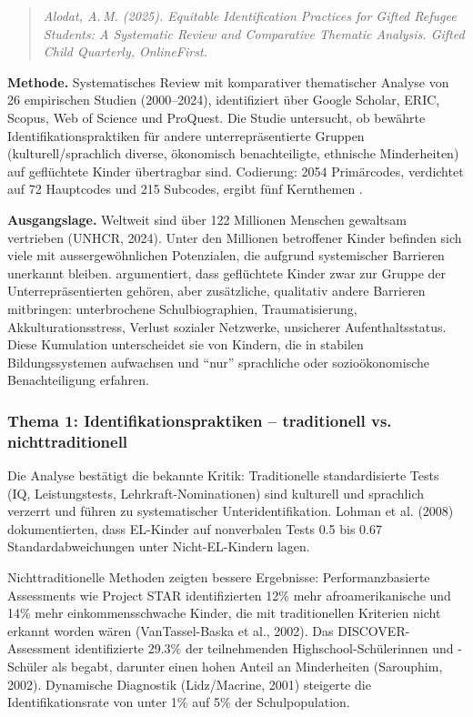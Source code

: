 \documentclass[ngerman, a4paper]{article}
\begin{document}
\begin{quote}\itshape
Alodat, A.\,M. (2025). Equitable Identification Practices for Gifted
Refugee Students: A Systematic Review and Comparative Thematic Analysis.
\upshape Gifted Child Quarterly, OnlineFirst.
\end{quote}

\textbf{Methode.} Systematisches Review mit komparativer thematischer
Analyse von 26 empirischen Studien (2000--2024), identifiziert über Google
Scholar, ERIC, Scopus, Web of Science und ProQuest. Die Studie untersucht,
ob bewährte Identifikationspraktiken für andere unterrepräsentierte Gruppen
(kulturell/sprachlich diverse, ökonomisch benachteiligte, ethnische
Minderheiten) auf geflüchtete Kinder übertragbar sind. Codierung: 2054
Primärcodes, verdichtet auf 72 Hauptcodes und 215 Subcodes, ergibt fünf
Kernthemen \parencite{alodat2025equitable}.

\textbf{Ausgangslage.} Weltweit sind über 122 Millionen Menschen
gewaltsam vertrieben (UNHCR, 2024). Unter den Millionen betroffener Kinder
befinden sich viele mit aussergewöhnlichen Potenzialen, die aufgrund
systemischer Barrieren unerkannt bleiben. \textcite{alodat2025equitable} argumentiert, dass
geflüchtete Kinder zwar zur Gruppe der Unterrepräsentierten gehören, aber
zusätzliche, qualitativ andere Barrieren mitbringen: unterbrochene
Schulbiographien, Traumatisierung, Akkulturationsstress, Verlust sozialer
Netzwerke, unsicherer Aufenthaltsstatus. Diese Kumulation unterscheidet
sie von Kindern, die in stabilen Bildungssystemen aufwachsen und
\enquote{nur} sprachliche oder sozioökonomische Benachteiligung erfahren.

\subsubsection*{Thema 1: Identifikationspraktiken -- traditionell vs.
  nichttraditionell}

Die Analyse bestätigt die bekannte Kritik: Traditionelle standardisierte
Tests (IQ, Leistungstests, Lehrkraft-Nominationen) sind kulturell und
sprachlich verzerrt und führen zu systematischer Unteridentifikation.
Lohman et al. (2008) dokumentierten, dass EL-Kinder auf nonverbalen Tests
0.5 bis 0.67 Standardabweichungen unter Nicht-EL-Kindern lagen.

Nichttraditionelle Methoden zeigten bessere Ergebnisse: Performanzbasierte
Assessments wie Project STAR identifizierten 12\% mehr afroamerikanische
und 14\% mehr einkommensschwache Kinder, die mit traditionellen Kriterien
nicht erkannt worden wären (VanTassel-Baska et al., 2002). Das
DISCOVER-Assessment identifizierte 29.3\% der teilnehmenden
Highschool-Schülerinnen und -Schüler als begabt, darunter einen hohen
Anteil an Minderheiten (Sarouphim, 2002). Dynamische Diagnostik
(Lidz/Macrine, 2001) steigerte die Identifikationsrate von unter 1\% auf
5\% der Schulpopulation.
\end{document}
